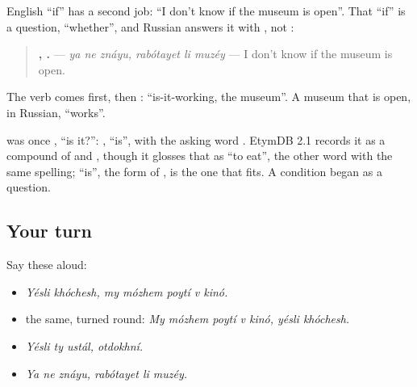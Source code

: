 \begin{grammarlens}[title={Grammar Lens: \textquotedblleft{}if\textquotedblright{} that means \textquotedblleft{}whether\textquotedblright{}}]
English \textquotedblleft{}if\textquotedblright{} has a second job: \textquotedblleft{}I don't know if the museum is open\textquotedblright{}. That \textquotedblleft{}if\textquotedblright{} is a question, \textquotedblleft{}whether\textquotedblright{}, and Russian answers it with \textbf{}, not \emph{}:

\begin{quote}
\textbf{  ,   .} — \emph{ya ne znáyu, rabótayet li muzéy} — I don't know if the museum is open.
\end{quote}

The verb comes first, then \textbf{}: \textquotedblleft{}is-it-working, the museum\textquotedblright{}. A museum that is open, in Russian, \textquotedblleft{}works\textquotedblright{}.
\end{grammarlens}

\begin{cousinweb}
\textbf{} was once \emph{ }, \textquotedblleft{}is it?\textquotedblright{}: \emph{}, \textquotedblleft{}is\textquotedblright{}, with the asking word \emph{}. EtymDB 2.1 records it as a compound of \emph{} and \emph{}, though it glosses that \emph{} as \textquotedblleft{}to eat\textquotedblright{}, the other word with the same spelling; \textquotedblleft{}is\textquotedblright{}, the form of \emph{}, is the one that fits. A condition began as a question.
\end{cousinweb}

\subsection*{Your turn}
Say these aloud:

\begin{itemize}
\raggedright
  \item \emph{Yésli khóchesh, my mózhem poytí v kinó.}
  \item the same, turned round: \emph{My mózhem poytí v kinó, yésli khóchesh.}
  \item \emph{Yésli ty ustál, otdokhní.}
  \item \emph{Ya ne znáyu, rabótayet li muzéy.}
\end{itemize}


